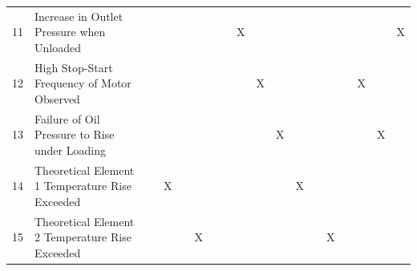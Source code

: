 \begin{table}[htbp]
\begin{tabular}{r|l|r|r|r|r|r|r|r|r|r|r|r|r|r|r|r|r}
    11    & Increase in Outlet Pressure when Unloaded &       &       &       &       &       &       & X     &       &       &       &       &       &       &       &       & X \\
    12    & High Stop-Start Frequency of Motor Observed &       &       &       &       &       &       &       & X     &       &       &       &       &       & X     &       &  \\
    13    & Failure of Oil Pressure to Rise under Loading &       &       &       &       &       &       &       &       & X     &       &       &       &       &       & X     &  \\
    14    & Theoretical Element 1 Temperature Rise Exceeded &       & X     &       &       &       &       &       &       &       & X     &       &       &       &       &       &  \\
    15    & Theoretical Element 2 Temperature Rise Exceeded &       &       &       & X     &       &       &       &       &       &       &       & X     &       &       &       &  \\
    \bottomrule
    \end{tabular}%
  \label{tab:ruleset}%
\end{table}%

